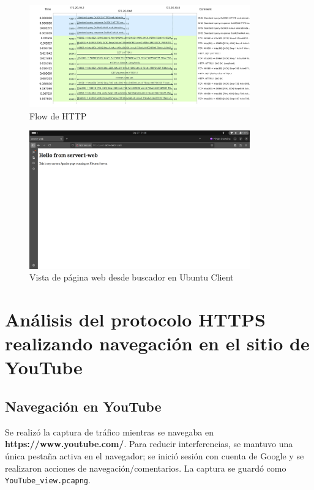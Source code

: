 \documentclass[10pt]{article}
\begin{document}
\begin{figure}[H]
    \centering
    \includegraphics[width=0.85\textwidth]{lab-02-screenshots/8.4-HTTP-flow}
    \caption{Flow de HTTP}
\end{figure}


\begin{figure}[H]
    \centering
    \includegraphics[width=0.85\textwidth]{lab-02-screenshots/8.4-web-browser}
    \caption{Vista de página web desde buscador en Ubuntu Client}
\end{figure}


\renewcommand{\thesection}{8.\arabic{section}}
\section{Análisis del protocolo HTTPS realizando navegación en el sitio de YouTube}

\subsection{Navegación en YouTube}
Se realizó la captura de tráfico mientras se navegaba en \textbf{https://www.youtube.com/}. 
Para reducir interferencias, se mantuvo una única pestaña activa en el navegador; se inició sesión con cuenta de Google y se realizaron acciones de navegación/comentarios. 
La captura se guardó como \texttt{YouTube\_view.pcapng}.
\end{document}
